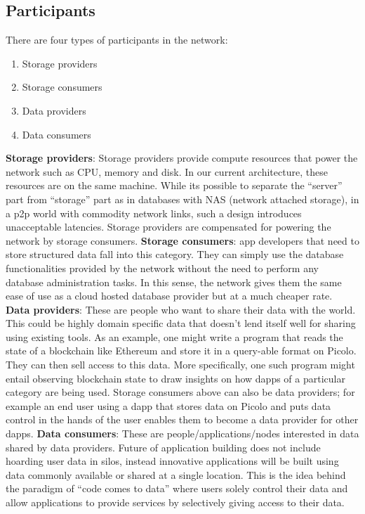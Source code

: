 \subsection{Participants} \label{sec:participants}
There are four types of participants in the network:
\begin{enumerate}
	\item Storage providers
	\item Storage consumers
	\item Data providers
	\item Data consumers \newline
\end{enumerate}
\textbf{Storage providers}: Storage providers provide compute resources that power the network such as CPU, memory and disk. In our current architecture, these resources are on the same machine. While its possible to separate the ``server'' part from ``storage'' part as in databases with NAS (network attached storage), in a p2p world with commodity network links, such a design introduces unacceptable latencies. Storage providers are compensated for powering the network by storage consumers. 
\newline\newline
\textbf{Storage consumers}: \DJ app developers that need to store structured data fall into this category. They can simply use the database functionalities provided by the network without the need to perform any database administration tasks. In this sense, the network gives them the same ease of use as a cloud hosted database provider but at a much cheaper rate.
\newline\newline
\textbf{Data providers}: These are people who want to share their data with the world. This could be highly domain specific data that doesn't lend itself well for sharing using existing tools. As an example, one might write a program that reads the state of a blockchain like Ethereum and store it in a query-able format on \textsf{Picolo}. They can then sell access to this data. More specifically, one such program might entail observing blockchain state to draw insights on how dapps of a particular category are being used. Storage consumers above can also be data providers; for example an end user using a dapp that stores data on \textsf{Picolo} and puts data control in the hands of the user enables them to become a data provider for other dapps. 
\newline\newline
\textbf{Data consumers}: These are people/applications/nodes interested in data shared by data providers. Future of application building does not include hoarding user data in silos, instead innovative applications will be built using data commonly available or shared at a single location. This is the idea behind the paradigm of ``code comes to data'' where users solely control their data and allow applications to provide services by selectively giving access to their data.


